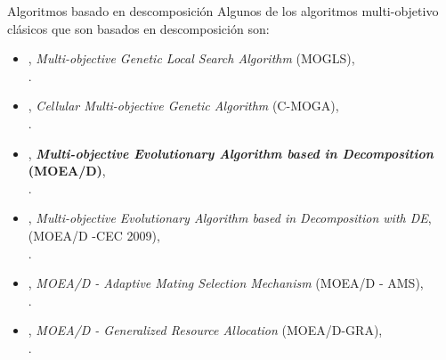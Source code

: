 \documentclass{beamer}
\begin{document}
 
\begin{frame}{Algoritmos basado en descomposición}
Algunos de los algoritmos multi-objetivo clásicos que son basados en descomposición son:
\begin{itemize}
     \scriptsize
    \item \citeyear{ishibuchi1998multi}, \textit{Multi-objective Genetic Local Search Algorithm} (MOGLS), \\ \citeauthor{ishibuchi1998multi}.
    \item \citeyear{murata2002cellular}, \textit{Cellular Multi-objective Genetic Algorithm} (C-MOGA), \\ \citeauthor{murata2002cellular}.
    \item \citeyear{Joel:MOEAD}, \textbf{\textit{Multi-objective Evolutionary Algorithm based in Decomposition} (MOEA/D)}, \\ \citeauthor{Joel:MOEAD}.
     \item \citeyear{li2009multiobjective}, \textit{Multi-objective Evolutionary Algorithm based in Decomposition with DE}, (MOEA/D -CEC 2009), \\ \citeauthor{li2009multiobjective}.
    \item \citeyear{Joel:MOEAD_AMS}, \textit{MOEA/D - Adaptive Mating Selection Mechanism} (MOEA/D - AMS), \\ \citeauthor{Joel:MOEAD_AMS}.
    \item \citeyear{zhou2015all}, \textit{MOEA/D - Generalized Resource Allocation} (MOEA/D-GRA), \\ \citeauthor{zhou2015all}.
\end{itemize}
\end{frame}
\end{document}
